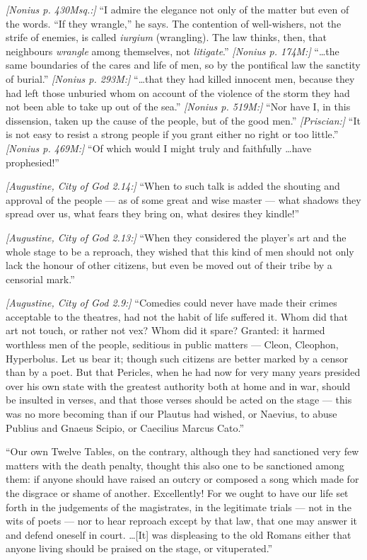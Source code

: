  \textit{[Nonius p. 430Msq.:]} ``I admire the elegance not only of the matter but even of the words. ``If they wrangle,'' he says. The contention of well-wishers, not the strife of enemies, is called \textit{iurgium} (wrangling). The law thinks, then, that neighbours \textit{wrangle} among themselves, not \textit{litigate}.'' \textit{[Nonius p. 174M:]} ``\ldots the same boundaries of the cares and life of men, so by the pontifical law the sanctity of burial.'' \textit{[Nonius p. 293M:]} ``\ldots that they had killed innocent men, because they had left those unburied whom on account of the violence of the storm they had not been able to take up out of the sea.'' \textit{[Nonius p. 519M:]} ``Nor have I, in this dissension, taken up the cause of the people, but of the good men.'' \textit{[Priscian:]} ``It is not easy to resist a strong people if you grant either no right or too little.'' \textit{[Nonius p. 469M:]} ``Of which would I might truly and faithfully \ldots have prophesied!''

 \textit{[Augustine, City of God 2.14:]} ``When to such talk is added the shouting and approval of the people --- as of some great and wise master --- what shadows they spread over us, what fears they bring on, what desires they kindle!''

 \textit{[Augustine, City of God 2.13:]} ``When they considered the player's art and the whole stage to be a reproach, they wished that this kind of men should not only lack the honour of other citizens, but even be moved out of their tribe by a censorial mark.''

 \textit{[Augustine, City of God 2.9:]} ``Comedies could never have made their crimes acceptable to the theatres, had not the habit of life suffered it. Whom did that art not touch, or rather not vex? Whom did it spare? Granted: it harmed worthless men of the people, seditious in public matters --- Cleon, Cleophon, Hyperbolus. Let us bear it; though such citizens are better marked by a censor than by a poet. But that Pericles, when he had now for very many years presided over his own state with the greatest authority both at home and in war, should be insulted in verses, and that those verses should be acted on the stage --- this was no more becoming than if our Plautus had wished, or Naevius, to abuse Publius and Gnaeus Scipio, or Caecilius Marcus Cato.''

 ``Our own Twelve Tables, on the contrary, although they had sanctioned very few matters with the death penalty, thought this also one to be sanctioned among them: if anyone should have raised an outcry or composed a song which made for the disgrace or shame of another. Excellently! For we ought to have our life set forth in the judgements of the magistrates, in the legitimate trials --- not in the wits of poets --- nor to hear reproach except by that law, that one may answer it and defend oneself in court. \ldots [It] was displeasing to the old Romans either that anyone living should be praised on the stage, or vituperated.''

